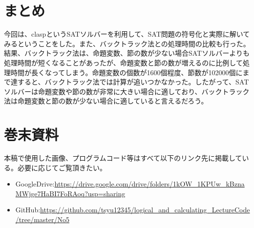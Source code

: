 \documentclass[dvipdfmx]{jsarticle}
\begin{document}
\section{まとめ}
今回は、claspというSATソルバーを利用して、SAT問題の符号化と実際に解いてみるということをした。また、バックトラック法との処理時間の比較も行った。結果、バックトラック法は、命題変数、節の数が少ない場合SATソルバーよりも処理時間が短くなることがあったが、命題変数と節の数が増えるのに比例して処理時間が長くなってしまう。命題変数の個数が1600個程度、節数が102000個にまで達すると、バックトラック法では計算が追いつかなかった。したがって、SATソルバーは命題変数や節の数が非常に大きい場合に適しており、バックトラック法は命題変数と節の数が少ない場合に適していると言えるだろう。
\section{巻末資料}
本稿で使用した画像、プログラムコード等はすべて以下のリンク先に掲載している。必要に応じてご覧頂きたい。
\begin{itemize}
  \item GoogleDrive:\url{https://drive.google.com/drive/folders/1kOW_1KPUw_kBznaMWjge7HaBI7FoRAoq?usp=sharing}
  \item GitHub:\url{https://github.com/tsyu12345/logical_and_calculating_LectureCode/tree/master/No5}
\end{itemize}
\end{document}

